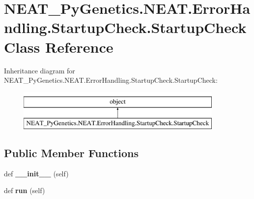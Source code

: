 \hypertarget{class_n_e_a_t___py_genetics_1_1_n_e_a_t_1_1_error_handling_1_1_startup_check_1_1_startup_check}{}\section{N\+E\+A\+T\+\_\+\+Py\+Genetics.\+N\+E\+A\+T.\+Error\+Handling.\+Startup\+Check.\+Startup\+Check Class Reference}
\label{class_n_e_a_t___py_genetics_1_1_n_e_a_t_1_1_error_handling_1_1_startup_check_1_1_startup_check}
Inheritance diagram for N\+E\+A\+T\+\_\+\+Py\+Genetics.\+N\+E\+A\+T.\+Error\+Handling.\+Startup\+Check.\+Startup\+Check\+:\begin{figure}[H]
\begin{center}
\leavevmode
\includegraphics[height=2.000000cm]{class_n_e_a_t___py_genetics_1_1_n_e_a_t_1_1_error_handling_1_1_startup_check_1_1_startup_check}
\end{center}
\end{figure}
\subsection*{Public Member Functions}
\begin{DoxyCompactItemize}
\item 
def {\bfseries \+\_\+\+\_\+init\+\_\+\+\_\+} (self)\hypertarget{class_n_e_a_t___py_genetics_1_1_n_e_a_t_1_1_error_handling_1_1_startup_check_1_1_startup_check_a1e599ee38990fc5249559baf65685459}{}\label{class_n_e_a_t___py_genetics_1_1_n_e_a_t_1_1_error_handling_1_1_startup_check_1_1_startup_check_a1e599ee38990fc5249559baf65685459}

\item 
def {\bfseries run} (self)\hypertarget{class_n_e_a_t___py_genetics_1_1_n_e_a_t_1_1_error_handling_1_1_startup_check_1_1_startup_check_a03356f117dc673d35d69882ecabad2a3}{}\label{class_n_e_a_t___py_genetics_1_1_n_e_a_t_1_1_error_handling_1_1_startup_check_1_1_startup_check_a03356f117dc673d35d69882ecabad2a3}

\end{DoxyCompactItemize}
